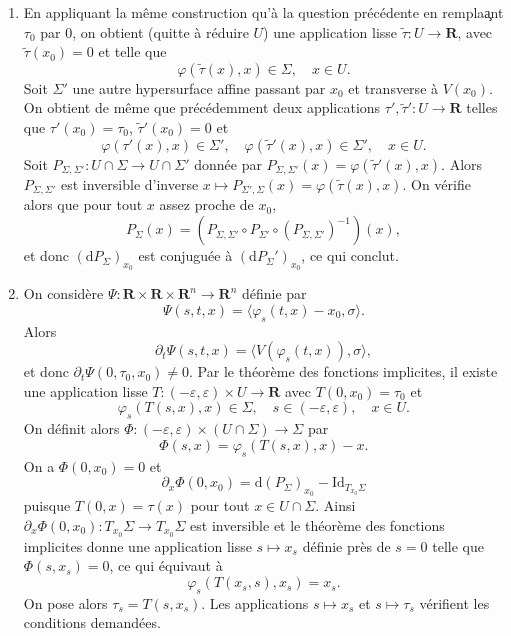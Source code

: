 \documentclass[a4paper,12pt,openany]{article}
\theoremstyle{plain}
\theoremstyle{definition}
\newcommand{\dd}{\mathrm{d}}
\newcommand{\R}{\mathbf{R}}
\begin{document}
\begin{enumerate}[resume]
\item En appliquant la m\^eme construction qu'\`a la question pr\'ec\'edente en rempla\c ant $\tau_0$ par $0$, on obtient (quitte \`a r\'eduire $U$) une application lisse $\tilde \tau : U \to \R$, avec $\tilde \tau(x_0) = 0$ et telle que 
$$
\varphi(\tilde \tau(x), x) \in \Sigma, \quad x  \in U.
$$
Soit $\Sigma'$ une autre hypersurface affine passant par $x_0$ et transverse \`a $V(x_0)$. On obtient de m\^eme que pr\'ec\'edemment deux applications $\tau', \tilde \tau' : U \to \R$ telles que $\tau'(x_0) = \tau_0$, $\tilde \tau'(x_0) = 0$ et
$$
\varphi(\tau'(x), x) \in \Sigma', \quad \varphi(\tilde \tau'(x), x) \in \Sigma',  \quad x  \in U.
$$
Soit $P_{\Sigma, \Sigma'} : U \cap \Sigma \to U \cap \Sigma'$ donn\'ee par
$
P_{\Sigma, \Sigma'}(x) = \varphi(\tilde \tau'(x), x).
$
Alors $P_{\Sigma, \Sigma'}$ est inversible d'inverse $x \mapsto P_{\Sigma', \Sigma}(x) = \varphi(\tilde \tau(x), x)$. On v\'erifie alors que pour tout $x$ assez proche de $x_0$,
$$
P_\Sigma(x) = \left(P_{\Sigma, \Sigma'} \circ P_{\Sigma'} \circ (P_{\Sigma, \Sigma'})^{-1}\right) (x),
$$
et donc 
$
(\dd P_\Sigma)_{x_0}
$
est conjugu\'ee \`a $(\dd P_\Sigma')_{x_0}$, ce qui conclut.
\item On consid\`ere $\Psi : \R \times \R \times \R^n \to \R^n$ d\'efinie par
$$
\Psi(s, t, x) = \langle \varphi_s(t, x) - x_0, \sigma \rangle.
$$
Alors 
$$
\partial_t \Psi(s, t, x) =  \langle V(\varphi_s(t,x)), \sigma \rangle,
$$
et donc $\partial_t \Psi(0, \tau_0, x_0) \neq 0$. Par le th\'eor\`eme des fonctions implicites, il existe une application lisse $T : (-\varepsilon, \varepsilon) \times U \to \R$ avec $T(0, x_0) = \tau_0$ et
$$
\varphi_s(T(s,x), x) \in \Sigma, \quad s \in (-\varepsilon, \varepsilon), \quad x \in U.
$$
On d\'efinit alors $\Phi : (-\varepsilon, \varepsilon) \times (U \cap \Sigma) \to \Sigma$ par
$$
\Phi(s, x) = \varphi_s(T(s,x), x) - x.
$$
On a $\Phi(0, x_0) = 0$ et
$$
\partial_x \Phi(0, x_0) = \dd (P_{\Sigma})_{x_0} - \mathrm{Id}_{T_{x_0}\Sigma}
$$
puisque $T(0, x) = \tau(x)$ pour tout $x \in U\cap \Sigma$. Ainsi $\partial_x \Phi(0, x_0) : T_{x_0}\Sigma \to T_{x_0} \Sigma$ est inversible et le th\'eor\`eme des fonctions implicites donne une application lisse $s \mapsto x_s$ d\'efinie pr\`es de $s=0$ telle que $\Phi(s, x_s)= 0$, ce qui \'equivaut \`a 
$$
\varphi_s(T(x_s,s), x_s) = x_s.
$$
On pose alors $\tau_s = T(s, x_s)$. Les applications $s \mapsto x_s$ et $s \mapsto \tau_s$ v\'erifient les conditions demand\'ees.
\end{enumerate}
\end{document}
